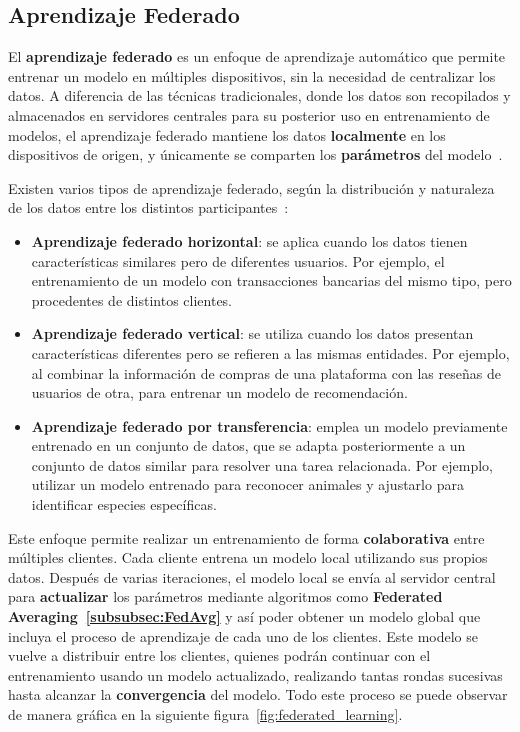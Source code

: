 \subsection{Aprendizaje Federado}
\label{sec:AprendizajeFederado}
El \textbf{aprendizaje federado} es un enfoque de aprendizaje automático que permite entrenar un modelo en múltiples dispositivos, sin la necesidad de centralizar los datos. A diferencia de las técnicas tradicionales, donde los datos son recopilados y almacenados en servidores centrales para su posterior uso en entrenamiento de modelos, el aprendizaje federado mantiene los datos \textbf{localmente} en los dispositivos de origen, y únicamente se comparten los \textbf{parámetros} del modelo~\cite{aprendizaje_federado_video}.

Existen varios tipos de aprendizaje federado, según la distribución y naturaleza de los datos entre los distintos participantes~\cite{aprendizaje_federado_introduccion}:

\begin{itemize}
    \item \textbf{Aprendizaje federado horizontal}: se aplica cuando los datos tienen características similares pero de diferentes usuarios. Por ejemplo, el entrenamiento de un modelo con transacciones bancarias del mismo tipo, pero procedentes de distintos clientes.
    
    \item \textbf{Aprendizaje federado vertical}: se utiliza cuando los datos presentan características diferentes pero se refieren a las mismas entidades. Por ejemplo, al combinar la información de compras de una plataforma con las reseñas de usuarios de otra, para entrenar un modelo de recomendación.
    
    \item \textbf{Aprendizaje federado por transferencia}: emplea un modelo previamente entrenado en un conjunto de datos, que se adapta posteriormente a un conjunto de datos similar para resolver una tarea relacionada. Por ejemplo, utilizar un modelo entrenado para reconocer animales y ajustarlo para identificar especies específicas.
\end{itemize}

Este enfoque permite realizar un entrenamiento de forma \textbf{colaborativa} entre múltiples clientes. Cada cliente entrena un modelo local utilizando sus propios datos. Después de varias iteraciones, el modelo local se envía al servidor central para \textbf{actualizar} los parámetros mediante algoritmos como \textbf{Federated Averaging~\ref{subsubsec:FedAvg}} y así poder obtener un modelo global que incluya el proceso de aprendizaje de cada uno de los clientes. Este modelo se vuelve a distribuir entre los clientes, quienes podrán continuar con el entrenamiento usando un modelo actualizado, realizando tantas rondas sucesivas hasta alcanzar la \textbf{convergencia} del modelo. Todo este proceso se puede observar de manera gráfica en la siguiente figura~\ref{fig:federated_learning}.

